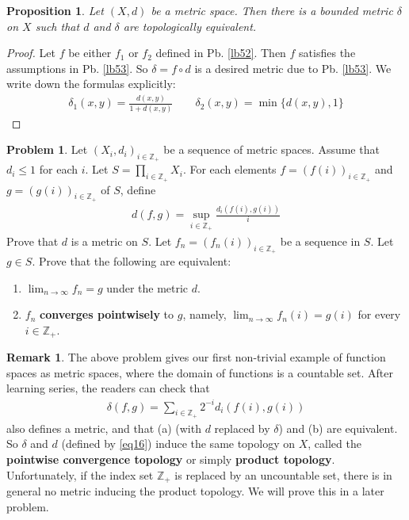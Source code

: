 \documentclass[12pt,b5paper,notitlepage]{article}
\theoremstyle{definition}
\newtheorem{rem}[df]{Remark}
\newtheorem{prob}{Problem}[section]
\theoremstyle{plain}
\newtheorem{pp}[df]{Proposition}
\newcommand{\Zbb}{\mathbb Z}
\newcommand{\dps}{\displaystyle}
\numberwithin{equation}{section}
\begin{document}
\begin{pp}
Let $(X,d)$ be a metric space. Then there is a bounded metric $\delta$ on $X$ such that $d$ and $\delta$ are topologically equivalent.
\end{pp}
\begin{proof}
Let $f$ be either $f_1$ or $f_2$ defined in Pb. \ref{lb52}. Then $f$ satisfies the assumptions in Pb. \ref{lb53}. So $\delta=f\circ d$ is a desired metric due to Pb. \ref{lb53}. We write down the formulas explicitly:
\begin{align*}
\delta_1(x,y)=\frac{d(x,y)}{1+d(x,y)}\qquad \delta_2(x,y)=\min\{d(x,y),1\}
\end{align*}
\end{proof}

\begin{prob}\label{lb78}
Let $(X_i,d_i)_{i\in\Zbb_+}$ be a sequence of metric spaces. Assume that $d_i\leq 1$ for each $i$. Let $\dps S=\prod_{i\in\Zbb_+} X_i$. For each elements $f=(f(i))_{i\in\Zbb_+}$ and $g=(g(i))_{i\in\Zbb_+}$ of $S$, define
\begin{align}
d(f,g)=\sup_{i\in\Zbb_+} \frac {d_i(f(i),g(i))}{i}  \label{eq16}
\end{align} 
Prove that $d$ is a metric on $S$. Let $f_n=(f_n(i))_{i\in\Zbb_+}$ be a sequence in $S$. Let $g\in S$. Prove that the following are equivalent:
\begin{enumerate}[label=(\alph*)]
\item $\dps \lim_{n\rightarrow\infty} f_n=g$ under the metric $d$.
\item $f_n$ \textbf{converges pointwisely} to $g$, namely, $\dps\lim_{n\rightarrow\infty} f_n(i)=g(i)$ for every $i\in\Zbb_+$.
\end{enumerate}
\end{prob}

\begin{rem}
The above problem gives our first non-trivial example of function spaces  as metric spaces, where the domain of functions is a countable set. After learning series, the readers can check that 
\begin{align*}
\delta(f,g)=\sum_{i\in\Zbb_+}2^{-i} d_i(f(i),g(i))
\end{align*}
also defines a metric, and that (a) (with $d$ replaced by $\delta$) and (b) are equivalent. So $\delta$ and $d$ (defined by \eqref{eq16}) induce the same topology on $X$, called the \textbf{pointwise convergence topology} or simply \textbf{product topology}. Unfortunately, if the index set $\Zbb_+$ is replaced by an uncountable set, there is in general no metric inducing the product topology. We will prove this in a later problem.
\end{rem}
\end{document}
